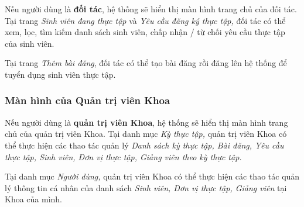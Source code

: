 \documentclass[./../main.tex]{subfiles}
\begin{document}
Nếu người dùng là \textbf{đối tác}, hệ thống sẽ hiển thị màn hình trang
chủ của đối tác. Tại trang \emph{Sinh viên đang thực tập} và \emph{Yêu
cầu đăng ký thực tập,} đối tác có thể xem, lọc, tìm kiếm danh sách sinh
viên, chấp nhận / từ chối yêu cầu thực tập của sinh viên.


Tại trang \emph{Thêm bài đăng}, đối tác có thể tạo bài đăng rồi đăng lên
hệ thống để tuyển dụng sinh viên thực tập.

\subsubsection{Màn hình của Quản trị viên Khoa}


Nếu người dùng là \textbf{quản trị viên Khoa}, hệ thống sẽ hiển thị màn
hình trang chủ của quản trị viên Khoa. Tại danh mục \emph{Kỳ thực tập,}
quản trị viên Khoa có thể thực hiện các thao tác quản lý \emph{Danh sách
kỳ thực tập, Bài đăng, Yêu cầu thực tập, Sinh viên, Đơn vị thực tập,
Giảng viên theo kỳ thực tập.}


Tại danh mục \emph{Người dùng,} quản trị viên Khoa có thể thực hiện các
thao tác quản lý thông tin cá nhân của danh sách \emph{Sinh viên, Đơn vị
thực tập, Giảng viên} tại Khoa của mình.
\end{document}
